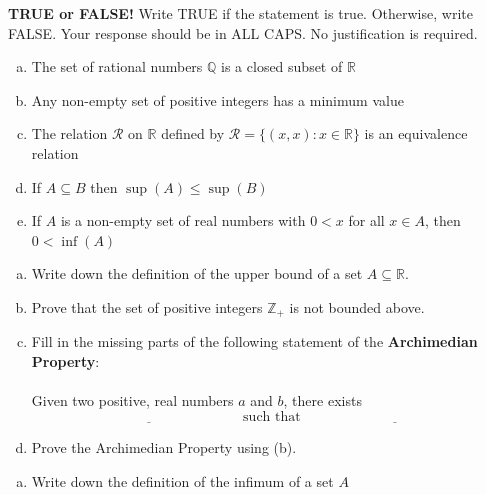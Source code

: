 \documentclass[11pt]{exam}
\theoremstyle{definition}
\begin{document}
\begin{questions}

\addpoints

\question[10]\mbox{}
\textbf{TRUE or FALSE!}  Write  TRUE if the statement is true.  Otherwise, write FALSE.  Your response should be in ALL CAPS.  No justification is required.
\begin{enumerate}[(a)]
\item  
The set of rational numbers $\mathbb Q$ is a closed subset of $\mathbb R$
\vspace{1.2in}
\item
Any non-empty set of positive integers has a minimum value
\vspace{1.2in}
\item
The relation $\mathcal R$ on $\mathbb R$ defined by $\mathcal R = \{(x,x): x\in \mathbb{R}\}$ is an equivalence relation
\vspace{1.2in}
\item
If $A\subseteq B$ then $\sup(A)\leq\sup(B)$
\vspace{1.2in}
\item  
If $A$ is a non-empty set of real numbers with $0 < x$ for all $x\in A$, then $0 < \inf(A)$
\vspace{1.2in}
\end{enumerate}

\newpage
\question[10]\mbox{}

\begin{enumerate}[(a)]
\item
Write down the definition of the upper bound of a set $A\subseteq \mathbb R$.
\vspace{1in}
\item
Prove that the set of positive integers $\mathbb{Z}_+$ is not bounded above.
\vspace{3.5in}
\item
Fill in the missing parts of the following statement of the \textbf{Archimedian Property}:\\\\
Given two positive, real numbers $a$ and $b$, there exists 
$$\underline{\quad\quad\quad\quad\quad\quad\quad\quad\quad\quad\quad\quad\quad}\ \text{such that}\ \underline{\quad\quad\quad\quad\quad\quad\quad\quad\quad\quad\quad\quad\quad}$$
\vspace{0.2in}
\item
Prove the Archimedian Property using (b).
\end{enumerate}

\newpage
\question[10]\mbox{}
\begin{enumerate}[(a)]
\item Write down the definition of the infimum of a set $A$
\vspace{1in}


\end{enumerate}
\end{questions}
\end{document}
